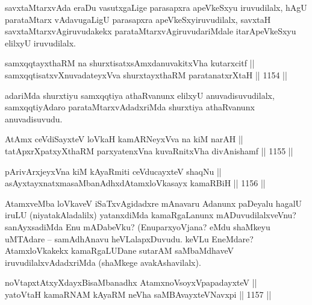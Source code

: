 \begin{artha}
savxtaMtarxvAda eraDu vasutxgaLige parasapxra apeVkeSxyu iruvudilalx, hAgU parataMtarx vAdavugaLigU parasapxra apeVkeSxyiruvudilalx, savxtaH savxtaMtarxvAgiruvudakekx parataMtarxvAgiruvudariMdale itarApeVkeSxyu elilxyU iruvudilalx.
\end{artha}

\begin{shl}
samxqqtayxthaRM na shurxtisatxsAmxdanuvakitxVha kutarxcitf ||  \\
samxqqtisatxvXnuvadateyxVva shurxtayxthaRM paratanatxrXtaH \hfill || 1154 ||  
\end{shl}

\begin{artha}
adariMda shurxtiyu samxqqtiya athaRvanunx elilxyU anuvadisuvudilalx, samxqqtiyAdaro parataMtarxvAdadxriMda shurxtiya athaRvanunx anuvadisuvudu.
\end{artha}



\begin{shl}
AtAmx ceVdiSayxteV loVkaH kamARNeyxVva na kiM narAH || \\
tatApxrXpatxyXthaRM parxyatenxVna kuvaRnitxVha divAnishamf \hfill || 1155 ||  
\end{shl}
				
\begin{shl}
pArivArxjeyxVna kiM kAyaRmiti ceVducayxteV shaqNu || \\
asAyxtayxnatxmasaMbanAdhxdAtamxloVkasayx kamaRBiH \hfill || 1156 ||  
\end{shl}

\begin{artha}
AtamxveMba loVkaveV iSaTxvAgidadxre mAnavaru Adanunx paDeyalu hagalU iruLU (niyatakAladalilx) yatanxdiMda kamaRgaLanunx mADuvudilalxveVnu? sanAyxsadiMda Enu mADabeVku? (EnuparxyoVjana? eMdu shaMkeyu uMTAdare {\rm --} samAdhAnavu heVLalapxDuvudu. keVLu EneMdare? AtamxloVkakekx kamaRgaLUDane sutarAM saMbaMdhaveV iruvudilalxvAdadxriMda (shaMkege avakAshavilalx).
\end{artha}


\begin{shl}
noVtapxtAtxyXdayxBisaMbanadhx AtamxnoV\s soyxVpapadayxteV || \\
yatoV\s taH kamaRNAM kAyaRM neVha saMBAvayxteV\s Navxpi \hfill || 1157 ||  
\end{shl}
				
